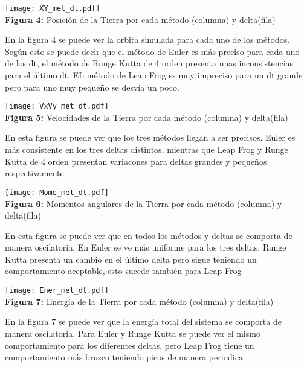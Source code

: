 \documentclass[11pt,letterpaper]{exam}
\begin{document}
\begin{center}
\texttt{[image: XY\_met\_dt.pdf]}
\\
\textbf{Figura 4: }{Posición de la Tierra por cada método (columna) y delta(fila)}
\end{center}
{En la figura 4 se puede ver la orbita simulada para cada uno de los métodos. Según esto se puede decir que el método de Euler es más preciso para cada uno de los dt, el método de Runge Kutta de 4 orden presenta unas inconsistencias para el último dt. EL método de Leap Frog es muy impreciso para un dt grande pero para uno muy pequeño se desvía un poco.}

\begin{center}
\texttt{[image: VxVy\_met\_dt.pdf]}
\\
\textbf{Figura 5: }{Velocidades de la Tierra por cada método (columna) y delta(fila)}
\end{center}
{En esta figura se puede ver que los tres métodos llegan a ser precisos. Euler es más consistente en los tres deltas distintos, mientras que Leap Frog y Runge Kutta de 4 orden presentan variacones para deltas grandes y pequeños respectivamente}

\begin{center}
    \texttt{[image: Mome\_met\_dt.pdf]}
    \\
    \textbf{Figura 6: }{Momentos angulares de la Tierra por cada método (columna) y delta(fila)}
\end{center}

{En esta figura se puede ver que en todos los métodos y deltas se comporta de manera oscilatoria. En Euler se ve más uniforme para los tres deltas, Runge Kutta presenta un cambio en el último delta pero sigue teniendo un comportamiento aceptable, esto sucede también para Leap Frog}

\begin{center}
\texttt{[image: Ener\_met\_dt.pdf]}    
\\
\textbf{Figura 7: }{Energía de la Tierra por cada método (columna) y delta(fila)}
\end{center}

{En la figura 7 se puede ver que la energía total del sistema se comporta de manera oscilatoria. Para Euler y Runge Kutta se puede ver el mismo comportamiento para los diferentes deltas, pero Leap Frog tiene un comportamiento más brusco teniendo picos de manera periodica}
\end{document}
